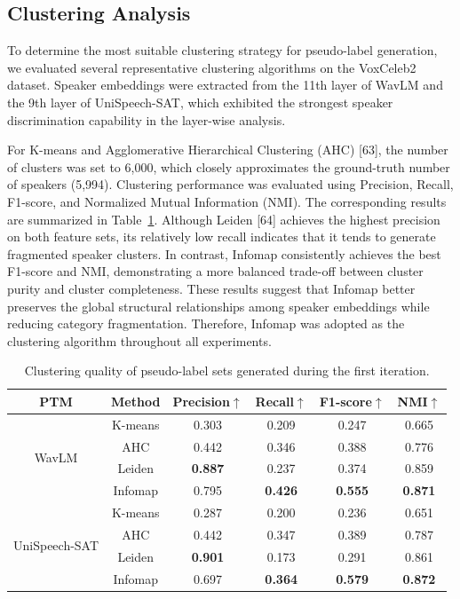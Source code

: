 \documentclass[lettersize,journal]{IEEEtran}
\begin{document}
\subsection{Clustering Analysis}

To determine the most suitable clustering strategy for pseudo-label generation, we evaluated several representative clustering algorithms on the VoxCeleb2 dataset. Speaker embeddings were extracted from the 11th layer of WavLM and the 9th layer of UniSpeech-SAT, which exhibited the strongest speaker discrimination capability in the layer-wise analysis.

For K-means and Agglomerative Hierarchical Clustering (AHC) [63], the number of clusters was set to 6,000, which closely approximates the ground-truth number of speakers (5,994). Clustering performance was evaluated using Precision, Recall, F1-score, and Normalized Mutual Information (NMI). The corresponding results are summarized in Table~\ref{tab:clustering}. Although Leiden [64] achieves the highest precision on both feature sets, its relatively low recall indicates that it tends to generate fragmented speaker clusters. In contrast, Infomap consistently achieves the best F1-score and NMI, demonstrating a more balanced trade-off between cluster purity and cluster completeness. These results suggest that Infomap better preserves the global structural relationships among speaker embeddings while reducing category fragmentation. Therefore, Infomap was adopted as the clustering algorithm throughout all experiments.


\begin{table}[!t] 
    \centering
    \caption{Clustering quality of pseudo-label sets generated during the first iteration.} %
    \setlength{\tabcolsep}{4pt} %
    \begin{tabular}{c c c c c c} %
        \hline
        PTM & Method & Precision$\uparrow$ & Recall$\uparrow$ & F1-score$\uparrow$ & NMI$\uparrow$ \\
        \hline
        \multirow{4}{*}{WavLM}
        & K-means  & 0.303 & 0.209 & 0.247  & 0.665  \\ 
        & AHC  & 0.442 & 0.346 & 0.388  & 0.776  \\
        & Leiden  & \textbf{0.887} & 0.237 & 0.374  & 0.859  \\
        & Infomap & 0.795 & \textbf{0.426} & \textbf{0.555} &\textbf{0.871}  \\
        \hline
        \multirow{4}{*}{UniSpeech-SAT}
        & K-means  & 0.287 & 0.200 & 0.236  & 0.651  \\ 
        & AHC  & 0.442 & 0.347 & 0.389  & 0.787  \\
        & Leiden  & \textbf{0.901} & 0.173 & 0.291  & 0.861  \\
        & Infomap  & 0.697 & \textbf{0.364} & \textbf{0.579}&\textbf{0.872}  \\
        \hline
    \end{tabular}
    \label{tab:clustering}
\end{table}
\end{document}
